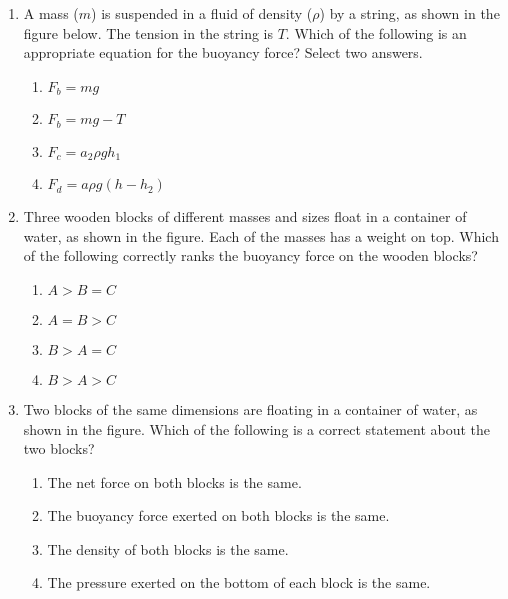 \documentclass{../../../oss-apphys}
\begin{document}
\begin{multicols}{2}
\begin{enumerate}[leftmargin=18pt,start=3]
  \item A mass ($m$) is suspended in a fluid of density ($\rho$) by a string,
    as shown in the figure below. The tension in the string is $T$. Which of
    the following is an appropriate equation for the buoyancy force? Select
    two answers.
    \begin{center}
      \vspace{-.15in}
    \end{center}
    \begin{enumerate}[noitemsep,topsep=0pt,leftmargin=18pt,label=(\Alph*)]
    \item $F_b=mg$
    \item $F_b=mg-T$
    \item $F_c=a_2 \rho gh_1$
    \item $F_d=a\rho g(h-h_2)$
    \end{enumerate}
    
  \item Three wooden blocks of different masses and sizes float in a container
    of water, as shown in the figure. Each of the masses has a weight on top.
    Which of the following correctly ranks the buoyancy force on the wooden
    blocks?
    \begin{center}
      \vspace{-.15in}
    \end{center}
    \begin{enumerate}[noitemsep,topsep=0pt,leftmargin=18pt,label=(\Alph*)]
    \item $A > B = C$
    \item $A = B > C$
    \item $B > A = C$
    \item $B > A > C$
    \end{enumerate}
    
  \item Two blocks of the same dimensions are floating in a container of water,
    as shown in the figure. Which of the following is a correct statement about
    the two blocks?
    \begin{center}
      \vspace{-.15in}
    \end{center}
    \begin{enumerate}[noitemsep,topsep=0pt,leftmargin=18pt,label=(\Alph*)]
    \item The net force on both blocks is the same.
    \item The buoyancy force exerted on both blocks is the same.
    \item The density of both blocks is the same.
    \item The pressure exerted on the bottom of each block is the same.
    \end{enumerate}


\end{enumerate}
\end{multicols}
\end{document}
